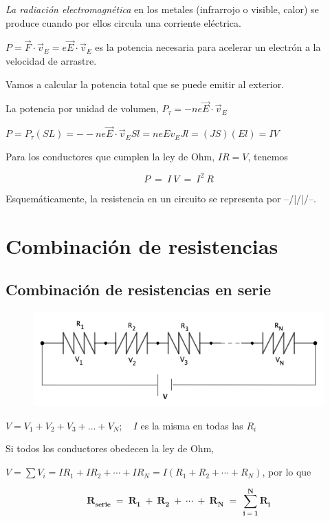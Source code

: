 \emph{La radiación electromagnética} en los metales (infrarrojo o visible, calor) se produce cuando por ellos circula una corriente eléctrica.

$P=\vec F \cdot \vec v_E=e\vec E \cdot \vec v_E$ es la potencia necesaria para acelerar un electrón  a la velocidad de arrastre.

Vamos a calcular la potencia total que se puede emitir al exterior.

La potencia por unidad de volumen, $P_\tau=-ne\vec E \cdot \vec v_E$

$P=P_\tau (SL)=--ne\vec E \cdot \vec v_E Sl=neEv_EJl =(JS)(El)=IV$

Para los conductores que cumplen la ley de Ohm, $IR=V$, tenemos

\begin{equation}
P \ = \ I \ V \ = \ I^2\ R
\end{equation}

Esquemáticamente, la resistencia en un circuito se representa por --/|/|/\---.

\section{Combinación de resistencias}

\subsection{Combinación de resistencias en serie}

\begin{figure}[H]
	\centering
	\includegraphics[width=.9\textwidth]{imagenes/imagenes25/T25IM02.png}
\end{figure}

$V=V_1+V_2+V_3+\dots +V_N;\quad I$ es la misma en todas las $R_i$

Si todos los conductores obedecen la ley de Ohm,

$V=\sum V_i= IR_1+IR_2+\cdots +IR_N=I(R_1+R_2+\cdots +R_N)$, por lo que

\begin{equation}
\boldsymbol{ R_{serie} \ = \ R_1 \ + \ R_2 \ + \ \cdots \ + \ R_N	 \ = \ \sum_{i=1}^N R_i }
\end{equation}

